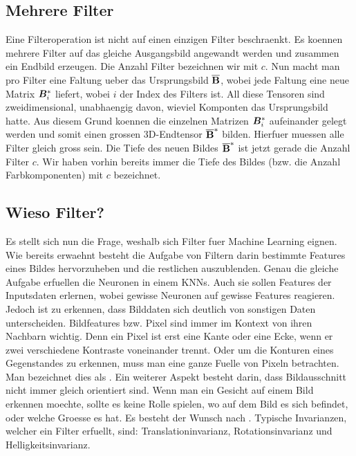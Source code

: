 \subsection{Mehrere Filter}
Eine Filteroperation ist nicht auf einen einzigen Filter beschraenkt. Es koennen
mehrere Filter auf das gleiche Ausgangsbild angewandt werden und zusammen ein
Endbild erzeugen.
\para{}
Die Anzahl Filter bezeichnen wir mit $c$.
Nun macht man pro Filter eine Faltung ueber das Ursprungsbild $\overline{\mathbf{B}}$, wobei
jede Faltung eine neue Matrix $\bm{B}^*_i$ liefert, wobei $i$ der Index des
Filters ist. All diese Tensoren sind zweidimensional, unabhaengig davon, wieviel
Komponten das Ursprungsbild hatte. Aus diesem Grund koennen die einzelnen
Matrizen $\bm{B}^*_i$ aufeinander gelegt werden und somit einen grossen 3D-Endtensor
$\overline{\mathbf{B}}^*$ bilden.
Hierfuer muessen alle Filter gleich gross sein.
Die Tiefe des neuen Bildes $\overline{\mathbf{B}}^*$ ist jetzt gerade die Anzahl Filter $c$.
Wir haben vorhin bereits immer die Tiefe des Bildes (bzw. die Anzahl
Farbkomponenten) mit $c$ bezeichnet.

\subsection{Wieso Filter?}
Es stellt sich nun die Frage, weshalb sich Filter fuer Machine
Learning eignen.
Wie bereits erwaehnt besteht die Aufgabe von Filtern darin bestimmte Features
eines Bildes hervorzuheben und die restlichen auszublenden. Genau die gleiche
Aufgabe erfuellen die Neuronen in einem KNNs. Auch sie sollen Features der
Inputsdaten erlernen, wobei gewisse Neuronen auf gewisse Features reagieren.
\para{}
Jedoch ist zu erkennen, dass Bilddaten sich deutlich von sonstigen Daten unterscheiden.
Bildfeatures bzw. Pixel sind immer im Kontext von ihren Nachbarn wichtig. Denn
ein Pixel ist erst eine Kante oder eine Ecke, wenn er zwei verschiedene
Kontraste voneinander trennt. Oder um die Konturen eines Gegenstandes zu
erkennen, muss man eine ganze Fuelle von Pixeln betrachten. Man bezeichnet
dies als .
\para{}
Ein weiterer Aspekt besteht darin, dass Bildausschnitt nicht immer gleich
orientiert sind. Wenn man ein Gesicht auf einem Bild erkennen moechte, sollte es
keine Rolle spielen, wo auf dem Bild es sich befindet, oder welche Groesse es
hat. Es besteht der Wunsch nach . Typische Invarianzen,
welcher ein Filter erfuellt, sind: Translationinvarianz, Rotationsinvarianz und Helligkeitsinvarianz.


